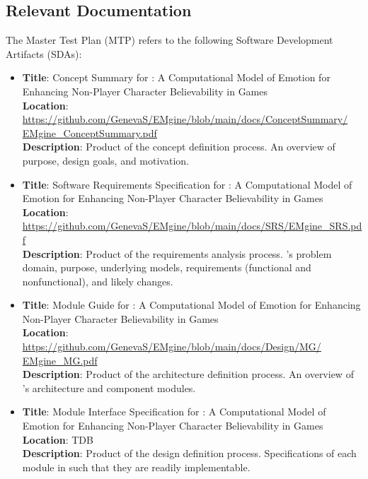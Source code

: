 \subsection{Relevant Documentation}
The Master Test Plan (MTP) refers to the following Software Development
Artifacts (SDAs):
\begin{itemize}

    \item \textbf{Title}: Concept Summary for \progname{}: A Computational
    Model of Emotion for Enhancing Non-Player Character Believability in Games
    \\
    \textbf{Location}:
    \href{https://github.com/GenevaS/EMgine/blob/main/docs/ConceptSummary/EMgine_ConceptSummary.pdf}{https://github.com/GenevaS/EMgine/blob/main/docs/ConceptSummary/\newline
     EMgine\_ConceptSummary.pdf} \\
    \textbf{Description}: Product of the concept definition process. An
    overview of \progname{} purpose, design goals, and motivation.

    \item \textbf{Title}: Software Requirements Specification for \progname{}:
    A Computational Model of Emotion for Enhancing Non-Player Character
    Believability in Games \\
    \textbf{Location}:
    \href{https://github.com/GenevaS/EMgine/blob/main/docs/SRS/EMgine_SRS.pdf}{https://github.com/GenevaS/EMgine/blob/main/docs/SRS/EMgine\_SRS.pdf}
     \\
    \textbf{Description}: Product of the requirements analysis process.
    \progname{}'s problem domain, purpose, underlying models, requirements
    (functional and nonfunctional), and likely changes.

    \item \textbf{Title}: Module Guide for \progname{}: A Computational Model
    of Emotion for Enhancing Non-Player Character Believability in Games \\
    \textbf{Location}:
    \href{https://github.com/GenevaS/EMgine/blob/main/docs/Design/MG/EMgine_MG.pdf}{https://github.com/GenevaS/EMgine/blob/main/docs/Design/MG/\newline
     EMgine\_MG.pdf} \\
    \textbf{Description}: Product of the architecture definition process. An
    overview of \progname{}'s architecture and component modules.

    \item \textbf{Title}: Module Interface Specification for \progname{}: A
    Computational Model of Emotion for Enhancing Non-Player Character
    Believability in Games \\
    \textbf{Location}: TDB \\
    \textbf{Description}: Product of the design definition process.
    Specifications of each module in \progname{} such that they are readily
    implementable.


\end{itemize}
